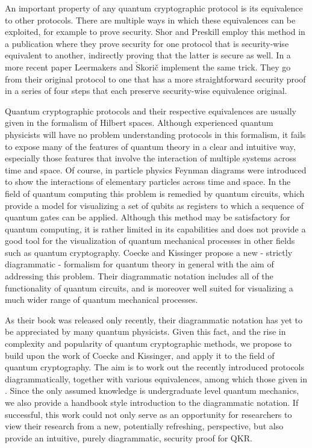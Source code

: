 \documentclass[]{article}
\begin{document}
An important property of any quantum cryptographic protocol is its equivalence to other protocols. There are multiple ways in which these equivalences can be exploited, for example to prove security. Shor and Preskill employ this method in a publication \cite{Shor2000} where they prove security for one protocol that is security-wise equivalent to another, indirectly proving that the latter is secure as well. In a more recent paper \cite{cryptoeprint:2019:875} Leermakers and $\check{\textrm{S}}$kori\v{c} implement the same trick. They go from their original protocol to one that has a more straightforward security proof in a series of four steps that each preserve security-wise equivalence original. 

Quantum cryptographic protocols and their respective equivalences are usually given in the formalism of Hilbert spaces. Although experienced quantum physicists will have no problem understanding protocols in this formalism, it fails to expose many of the features of quantum theory in a clear and intuitive way, especially those features that involve the interaction of multiple systems across time and space. Of course, in particle physics Feynman diagrams were introduced to show the interactions of elementary particles across time and space. In the field of quantum computing this problem is remedied by quantum circuits, which provide a model for visualizing a set of qubits as registers to which a sequence of quantum gates can be applied. Although this method may be satisfactory for quantum computing, it is rather limited in its capabilities and does not provide a good tool for the visualization of quantum mechanical processes in other fields such as quantum cryptography. Coecke and Kissinger \cite{Coecke2017} propose a new - strictly diagrammatic - formalism for quantum theory in general with the aim of addressing this problem. Their diagrammatic notation includes all of the functionality of quantum circuits, and is moreover well suited for visualizing a much wider range of quantum mechanical processes.


As their book was released only recently, their diagrammatic notation has yet to be appreciated by many quantum physicists. Given this fact, and the rise in complexity and popularity of quantum cryptographic methods, we propose to build upon the work of Coecke and Kissinger, and apply it to the field of quantum cryptography. The aim is to work out the recently introduced protocols diagrammatically, together with various equivalences, among which those given in \cite{cryptoeprint:2019:875}. Since the only assumed knowledge is undergraduate level quantum mechanics, we also provide a handbook style introduction to the diagrammatic notation. If successful, this work could not only serve as an opportunity for researchers to view their research from a new, potentially refreshing, perspective, but also provide an intuitive, purely diagrammatic, security proof for QKR.
\end{document}
